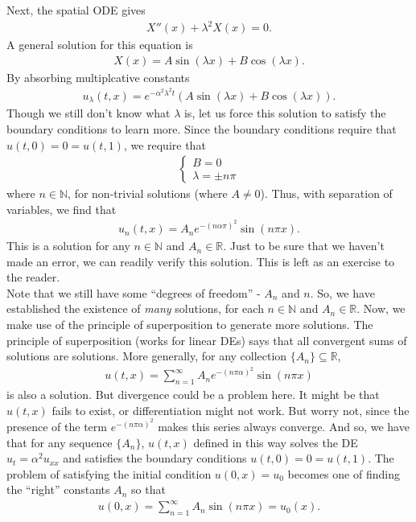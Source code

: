\documentclass{article}
\theoremstyle{definition}
\newcommand{\R}{\mathbb{R}}
\begin{document}
Next, the spatial ODE gives
\begin{align*}
X''(x) + \lambda^2 X(x) = 0.
\end{align*}
A general solution for this equation is
\begin{align*}
X(x) = A\sin(\lambda x) + B\cos(\lambda x).
\end{align*}
By absorbing multiplcative constants
\begin{align*}
u_\lambda(t,x) = e^{-\alpha^2\lambda^2 t}\left(A\sin(\lambda x) + B\cos(\lambda x) \right).
\end{align*}
Though we still don't know what $\lambda$ is, let us force this solution to satisfy the boundary conditions to learn more. Since the boundary conditions require that $u(t,0)=0=u(t,1)$, we require that
\begin{align*}
\begin{cases}
B=0\\
\lambda = \pm n\pi
\end{cases}
\end{align*}
where $n\in \mathbb{N}$, for non-trivial solutions (where $A\neq 0$). Thus, with separation of variables, we find that
\begin{align*}
u_n(t,x) = A_ne^{-(n\alpha\pi)^2}\sin(n\pi x).
\end{align*}
This is a solution for any $n\in \mathbb{N}$ and $A_n\in\R$. Just to be sure that we haven't made an error, we can readily verify this solution. This is left as an exercise to the reader. \\

Note that we still have some ``degrees of freedom'' - $A_n$ and $n$. So, we have established the existence of \textit{many} solutions, for each $n\in\mathbb{N}$ and $A_n\in\R$. Now, we make use of the principle of superposition to generate more solutions. The principle of superposition (works for linear DEs) says that all convergent sums of solutions are solutions. More generally, for any collection $\{A_n \} \subseteq\R$,
\begin{align*}
u(t,x) = \sum_{n=1}^\infty A_n e^{-(n\pi\alpha)^2}\sin(n\pi x)
\end{align*}
is also a solution. But divergence could be a problem here. It might be that $u(t,x)$ fails to exist, or differentiation might not work. But worry not, since the presence of the term $e^{-(n\pi\alpha)^2}$ makes this series always converge. And so, we have that for any sequence $\{ A_n\}$, $u(t,x)$ defined in this way solves the DE $u_t = \alpha^2 u_{xx}$ and satisfies the boundary conditions $u(t,0)=0=u(t,1)$. The problem of satisfying the initial condition $u(0,x) = u_0$ becomes one of finding the ``right'' constants $A_n$ so that 
\begin{align*}
u(0,x) = \sum_{n=1}^\infty A_n\sin(n\pi x) = u_0(x).
\end{align*} 
\end{document}
